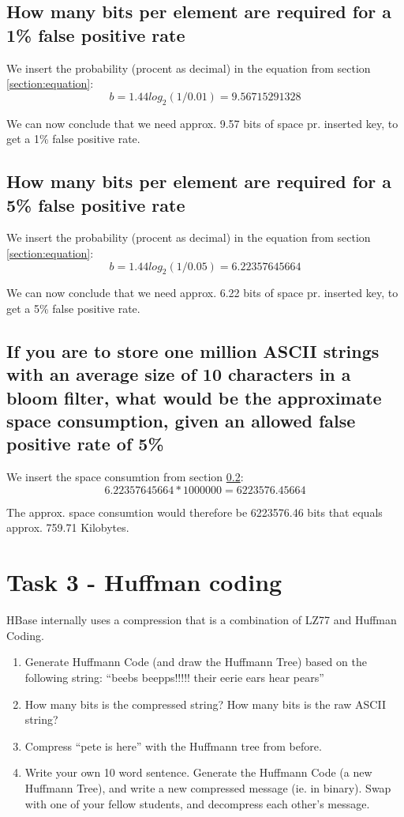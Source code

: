 \documentclass{article}
\begin{document}
\subsection{How many bits per element are required for a 1\% false positive rate}
We insert the probability (procent as decimal) in the equation from section \ref{section:equation}:
\[ b = 1.44log_2(1/0.01) = 9.56715291328\]

We can now conclude that we need approx. 9.57 bits of space pr. inserted key, to get a 1\% false positive rate.


\subsection{How many bits per element are required for a 5\% false positive rate}
\label{section:bitspritem}
We insert the probability (procent as decimal) in the equation from section \ref{section:equation}:
\[ b = 1.44log_2(1/0.05) = 6.22357645664\]

We can now conclude that we need approx. 6.22 bits of space pr. inserted key, to get a 5\% false positive rate.

\subsection{If you are to store one million ASCII strings with an average size of 10 characters in a bloom filter, what would be the approximate space consumption, given an allowed false positive rate of 5\%}
We insert the space consumtion from section \ref{section:bitspritem}:
\[ 6.22357645664*1000000 = 6223576.45664\]

The approx. space consumtion would therefore be 6223576.46 bits that equals approx. 759.71 Kilobytes. 

\section{Task 3 - Huffman coding}
HBase internally uses a compression that is a combination of LZ77 and Huffman Coding.
\begin{enumerate}
    \item Generate Huffmann Code (and draw the Huffmann Tree) based on the following string: “beebs beepps!!!!! their eerie ears hear pears”
    \item How many bits is the compressed string? How many bits is the raw ASCII string?
    \item Compress “pete is here” with the Huffmann tree from before.
    \item Write your own 10 word sentence. Generate the Huffmann Code (a new Huffmann Tree), and write a new compressed message (ie. in binary). Swap with one of your fellow students, and decompress each other’s message.

\end{enumerate}
\end{document}
